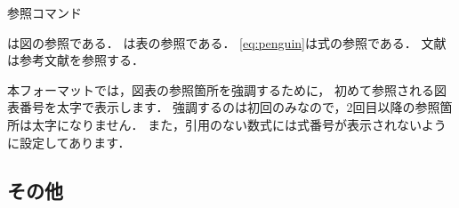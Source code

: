 \begin{lstbox}{参照コマンド}
\begin{minilst}
は図の参照である．
は表の参照である．
\eqref{eq:penguin}は式の参照である．
文献\Cite{penguin}は参考文献を参照する\cite{penguin}．
\end{minilst}
\end{lstbox}

本フォーマットでは，図表の参照箇所を強調するために，
初めて参照される図表番号を太字で表示します．
強調するのは初回のみなので，2回目以降の参照箇所は太字になりません．
また，引用のない数式には式番号が表示されないように設定してあります．

\subsection{その他}


